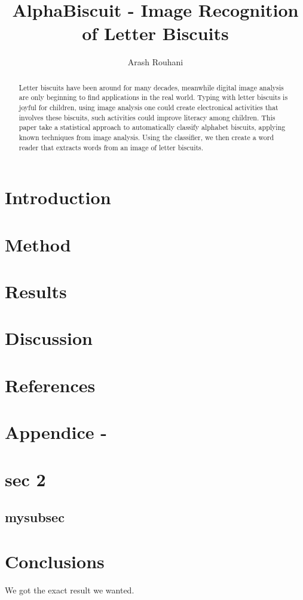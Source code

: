 \documentclass[a4paper,11pt]{article}
\title{AlphaBiscuit - Image Recognition of Letter Biscuits}
\author{Arash Rouhani}
\begin{document}
\maketitle

\begin{abstract}
Letter biscuits have been around for many decades, meanwhile digital
image analysis are only beginning to find applications in the real world.
Typing with letter biscuits is joyful for children, using image analysis
one could create electronical activities that involves these biscuits,
such activities could improve literacy among children.
This paper take a statistical approach to automatically classify
alphabet biscuits, applying known techniques from image analysis.
Using the classifier, we then create a word reader that
extracts words from an image of letter biscuits.


\end{abstract}

\section{Introduction}
\section{Method}
\section{Results}
\section{Discussion}
\section{References}
\section{Appendice -}
\section{sec 2}

\subsection{mysubsec}
\section{Conclusions}
We got the exact result we wanted.
\end{document}
